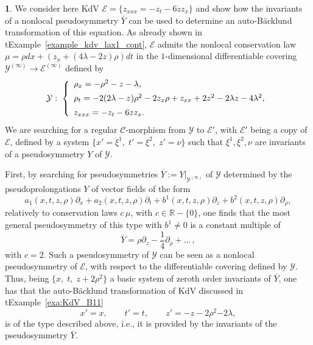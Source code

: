 \documentclass[12pt,english]{elsarticle}
\theoremstyle{plain}
\theoremstyle{plain}
\theoremstyle{remark}
\theoremstyle{plain}
\theoremstyle{definition}
\theoremstyle{definition}
\newtheorem{example}[thm]{\protect\examplename}
\providecommand{\examplename}{Example}
\begin{document}
\begin{example}
\label{exmp27}
We consider here KdV $\mathcal{E}=\{z_{xxx}=-z_{t}-6zz_{x}\}$ and show
how the invariants of a nonlocal pseudosymmetry $\bar{Y}$ can be used to
determine an auto-B\"{a}cklund transformation of this equation. As already
shown in t{Example~\ref{example_kdv_lax1_cont}}, $\mathcal{E}$ admits the
nonlocal conservation law
$\mu =\rho dx+\left (z_{x}+\left (4\lambda -2z\right )\rho \right )dt$
in the $1$-dimensional differentiable covering
$\mathcal{Y}^{(\infty )}\rightarrow \mathcal{E}^{(\infty )}$ defined by
%
\begin{equation*}
\mathcal{Y}:\;\left \{
%
\begin{array}{l}
\rho _{x}=-\rho ^{2}-z-\lambda ,
\vspace{5pt}
\\
\rho _{t}=-2(2\lambda -z)\rho ^{2}-2z_{x}\rho +z_{xx}+2z^{2}-2
\lambda z-4\lambda ^{2},
\vspace{5pt}
\\
z_{xxx}=-z_{t}-6zz_{x}.
\end{array}
%
\right .
\end{equation*}
%
We are searching for a regular $\mathcal{C}$-morphism from
$\mathcal{Y}$ to $\mathcal{E}'$, with $\mathcal{E}'$ being a copy of
$\mathcal{E}$, defined by a system
$\{x'=\xi ^{1},\;t'=\xi ^{2},\;z'=\nu \}$ such that
$\xi ^{1},\xi ^{2},\nu $ are invariants of a pseudosymmetry $Y$ of
$\mathcal{Y}$.

First, by searching for pseudosymmetries
$\bar{Y}:=\left .Y\right |_{\mathcal{Y}^{(\infty )}}$ of
$\mathcal{Y}$ determined by the pseudoprolongations $Y$ of vector fields
of the form
%
\begin{equation*}
a_{1}(x,t,z,\rho )\partial _{x}+a_{2}(x,t,z,\rho )\partial _{t}+b^{1}(x,t,z,
\rho )\partial _{z}+b^{2}(x,t,z,\rho )\partial _{\rho},
\end{equation*}
%
relatively to conservation laws $c\,\mu $, with
$c\in \mathbb{R}-\{0\}$, one finds that the most general pseudosymmetry
of this type with $b^{1}\neq 0$ is a constant multiple of
%
\begin{equation*}
\bar{Y}=\rho \partial _{z}-\frac{1}{4}\partial _{\rho}+\ldots \,,
\end{equation*}
%
with $c=2$. Such a pseudosymmetry of $\mathcal{Y}$ can be seen as a nonlocal
pseudosymmetry of $\mathcal{E}$, with respect to the differentiable covering
defined by $\mathcal{Y}$. Thus, being $\{x,\;t,\;z+2\rho ^{2}\}$ a basic
system of zeroth order invariants of $\bar{Y}$, one has that the auto-B\"{a}cklund
transformation of KdV discussed in t{Example~\ref{exa:KdV_B11}}
%
\begin{equation*}
x'=x,\qquad t'=t,\qquad z'=-z-2\rho ^{2}{-2\lambda},
\end{equation*}
%
is of the type described above, i.e., it is provided by the invariants
of the pseudosymmetry $\bar{Y}$.
\end{example}
\end{document}
